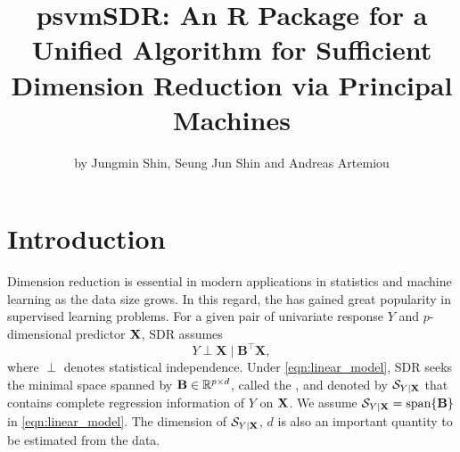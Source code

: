 
\title{{psvmSDR}: An R Package for a Unified Algorithm for Sufficient Dimension Reduction via Principal Machines}
\author{by Jungmin Shin, Seung Jun Shin and Andreas Artemiou}

\maketitle


\section{Introduction} \label{sec:INTRO}

Dimension reduction is essential in modern applications in statistics and machine learning as the data size grows. 
In this regard, the  \citep[SDR,][]{Li1991::sir,Cook1998::regr} has gained great popularity in supervised learning problems.
For a given pair of univariate response $Y$ and $p$-dimensional predictor $\mathbf{X}$, SDR assumes 
\begin{equation} \label{eqn:linear_model}
Y \perp \mathbf{X} \mid \mathbf{B}^{\top} \mathbf{X},     
\end{equation}
where $\perp$ denotes statistical independence. Under \eqref{eqn:linear_model}, SDR seeks the minimal space spanned by $\mathbf{B} \in \mathbb{R}^{p \times d}$, called the , and denoted by $\mathcal{S}_{Y\mid \mathbf{X}}$ that contains complete regression information of $Y$ on $\mathbf{X}$. We assume $\mathcal{S}_{Y\mid \mathbf{X}} = \mbox{span}\{\mathbf{B}\}$ in \eqref{eqn:linear_model}. The dimension of $\mathcal{S}_{Y\mid \mathbf{X}}$, $d$ is also an important quantity to be estimated from the data. 

